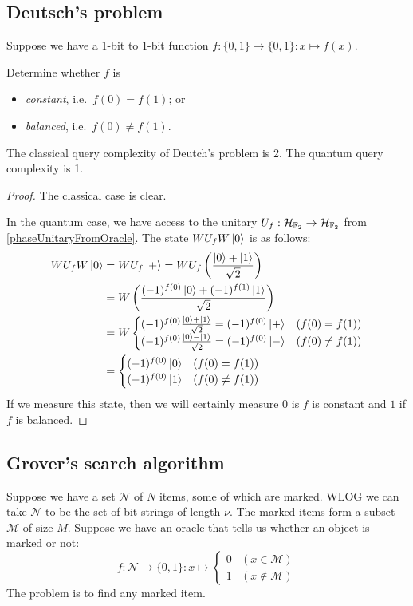 \subsection{Deutsch's problem}
\begin{problem}
Suppose we have a 1-bit to 1-bit function $f: \{0,1\} \to \{0,1\}: x\mapsto f(x)$.

Determine whether $f$ is
\begin{itemize}
    \item \emph{constant}, i.e.\ $f(0) = f(1)$; or
    \item \emph{balanced}, i.e.\ $f(0) \neq f(1)$.
\end{itemize}
\end{problem}

\begin{proposition}
The classical query complexity of Deutch's problem is 2. The quantum query complexity is 1.
\end{proposition}
\begin{proof}
The classical case is clear.

In the quantum case, we have access to the unitary $U_f: \mathcal{H}_{\mathbb{F}_2}\to \mathcal{H}_{\mathbb{F}_2}$ from \ref{phaseUnitaryFromOracle}. The state $WU_fW\left| 0 \right\rangle$ is as follows:
\begin{align*}
WU_fW\left| 0 \right\rangle &= WU_f\left| + \right\rangle = WU_f\left(\frac{\left| 0 \right\rangle+\left| 1 \right\rangle}{\sqrt{2}}\right) \\
&= W\left(\frac{(-1)^{f(0)}\left| 0 \right\rangle+(-1)^{f(1)}\left| 1 \right\rangle}{\sqrt{2}}\right) \\
&= W\begin{cases}
(-1)^{f(0)}\frac{\left| 0 \right\rangle + \left| 1 \right\rangle}{\sqrt{2}} = (-1)^{f(0)}\left| + \right\rangle & (f(0) = f(1)) \\
(-1)^{f(0)}\frac{\left| 0 \right\rangle - \left| 1 \right\rangle}{\sqrt{2}} = (-1)^{f(0)}\left| - \right\rangle & (f(0) \neq f(1))
\end{cases} \\
&= \begin{cases}
(-1)^{f(0)}\left| 0 \right\rangle & (f(0) = f(1)) \\
(-1)^{f(0)}\left| 1 \right\rangle & (f(0) \neq f(1))
\end{cases}
\end{align*} 
If we measure this state, then we will certainly measure $0$ is $f$ is constant and $1$ if $f$ is balanced.
\end{proof}



\subsection{Grover's search algorithm}
\begin{problem}
Suppose we have a set $\mathcal{N}$ of $N$ items, some of which are marked. WLOG we can take $\mathcal{N}$ to be the set of bit strings of length $\nu$. The marked items form a subset $\mathcal{M}$ of size $M$. Suppose we have an oracle that tells us whether an object is marked or not:
\[ f:\mathcal{N} \to \{0,1\}: x\mapsto \begin{cases}
0 & (x\in \mathcal{M}) \\
1 & (x\notin \mathcal{M})
\end{cases} \]
The problem is to find any marked item.
\end{problem}

